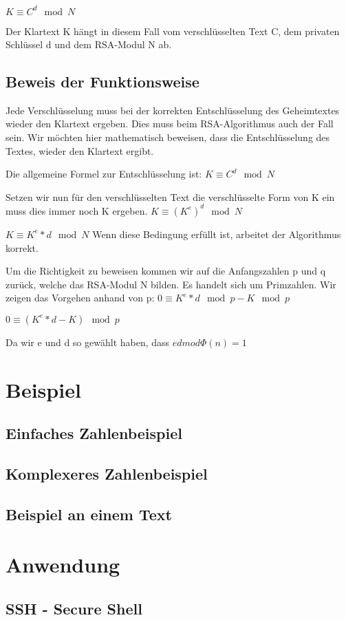 $ K \equiv C^d \mod N $

Der Klartext K hängt in diesem Fall vom verschlüsselten Text C, dem privaten Schlüssel d und dem RSA-Modul N ab. 

\subsection{Beweis der Funktionsweise}
Jede Verschlüsselung muss bei der korrekten Entschlüsselung des Geheimtextes wieder den Klartext ergeben. Dies muss beim RSA-Algorithmus auch der Fall sein. Wir möchten hier mathematisch beweisen, dass die Entschlüsselung des Textes, wieder den Klartext ergibt.

Die allgemeine Formel zur Entschlüsselung ist:
$ K \equiv C^d \mod N $

Setzen wir nun für den verschlüsselten Text die verschlüsselte Form von K ein muss dies immer noch K ergeben.
$ K \equiv (K^e)^d \mod N $

$ K \equiv K^e*d \mod N $
Wenn diese Bedingung erfüllt ist, arbeitet der Algorithmus korrekt.

Um die Richtigkeit zu beweisen kommen wir auf die Anfangszahlen p und q zurück, welche das RSA-Modul N bilden. Es handelt sich um Primzahlen. Wir zeigen das Vorgehen anhand von p:
$ 0 \equiv K^e*d \mod p - K \mod p $

$ 0 \equiv (K^e*d-K) \mod p $

Da wir e und d so gewählt haben, dass 
$ ed mod Φ(n) = 1 $ 


\section{Beispiel}
\subsection{Einfaches Zahlenbeispiel}
\subsection{Komplexeres Zahlenbeispiel}
\subsection{Beispiel an einem Text}
\section{Anwendung}
\subsection{SSH - Secure Shell}
